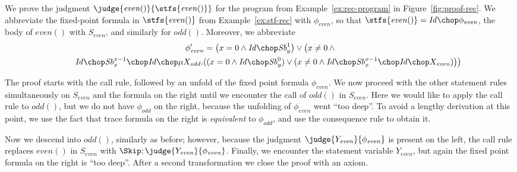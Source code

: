 \documentclass[a4paper,numberwithinsect]{lipics-v2021}
\begin{document}
\begin{example}\label{ex:proof-rec}
  We prove the judgment
  $\judge{\mathit{even}()}{\stfs{\mathit{even}()}}$ for the program
  from Example~\ref{ex:rec-program} in Figure~\ref{fig:proof-rec}. We
  abbreviate the fixed-point formula in $\stfs{\mathit{even}()}$ from
  Example~\ref{ex:stf-rec} with $\phi_{\mathit{even}}$, so that
  $\stfs{\mathit{even}()}=\mathit{Id}\chop\phi_{\mathit{even}}$, the
  body of $\mathit{even}()$ with $S_{\mathit{even}}$, and similarly
  for $\mathit{odd}()$. Moreover, we abbreviate
  \begin{multline*}
    \phi'_{\mathit{even}}=\bigl(x = 0\land\mathit{Id}\chop \mathit{Sb}^{1}_{y}\bigr)\lor
    \bigl(x \neq 0\,\land\\
    \qquad\mathit{Id} \chop \mathit{Sb}^{x-1}_{x} \chop \mathit{Id}\chop\mu X_{\mathit{odd}}.((x = 0 \land \mathit{Id} \chop \mathit{Sb}^{0}_{y}) \lor(x \neq 0 \land 
    \mathit{Id} \chop \mathit{Sb}^{x-1}_{x}\chop \mathit{Id} \chop X_{\mathit{even}})\bigr)\bigr)
  \end{multline*}
  
  The proof starts with the call rule, followed by an unfold of the
  fixed point formula $\phi_{\mathit{even}}$. We now proceed with the
  other statement rules simultaneously on $S_{\mathit{even}}$ and the
  formula on the right until we encounter the call of $\mathit{odd}()$
  in $S_{\mathit{even}}$. Here we would like to apply the call rule to
  $\mathit{odd}()$, but we do not have $\phi_{\mathit{odd}}$ on the
  right, because the unfolding of $\phi_{\mathit{even}}$ went ``too
  deep''. To avoid a lengthy derivation at this point, we use the fact
  that trace formula on the right is \emph{equivalent} to
  $\phi_{\mathit{odd}}$, and use the consequence rule to obtain it.

  Now we descend into $\mathit{odd}()$, similarly as before; however,
  because the judgment
  $\judge{Y_{\mathit{even}}}{\phi_{\mathit{even}}}$ is present on the
  left, the call rule replaces $\mathit{even}()$ in
  $S_{\mathit{even}}$ with
  $\Skip;\judge{Y_{\mathit{even}}}{\phi_{\mathit{even}}}$. Finally, we
  encounter the statement variable $Y_{\mathit{even}}$, but again the
  fixed point formula on the right is ``too deep''. After a second
  transformation we close the proof with an axiom.
\end{example}
\end{document}
